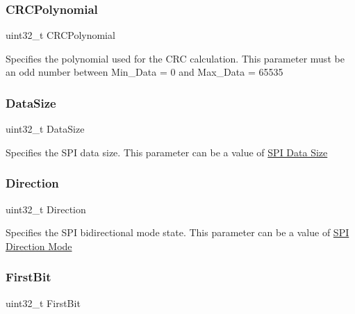 \subsubsection{\texorpdfstring{C\+R\+C\+Polynomial}{CRCPolynomial}}
{\footnotesize\ttfamily uint32\+\_\+t C\+R\+C\+Polynomial}

Specifies the polynomial used for the C\+RC calculation. This parameter must be an odd number between Min\+\_\+\+Data = 0 and Max\+\_\+\+Data = 65535 \mbox{\label{struct_s_p_i___init_type_def_a98999b0cd6e4c94f05b61b2554ee0371}} 
\subsubsection{\texorpdfstring{Data\+Size}{DataSize}}
{\footnotesize\ttfamily uint32\+\_\+t Data\+Size}

Specifies the S\+PI data size. This parameter can be a value of \hyperlink{group___s_p_i___data___size}{S\+PI Data Size} \mbox{\label{struct_s_p_i___init_type_def_ab94410c1333b512e271b1c135fe50916}} 
\subsubsection{\texorpdfstring{Direction}{Direction}}
{\footnotesize\ttfamily uint32\+\_\+t Direction}

Specifies the S\+PI bidirectional mode state. This parameter can be a value of \hyperlink{group___s_p_i___direction}{S\+PI Direction Mode} \mbox{\label{struct_s_p_i___init_type_def_a9740c535f073c87bb06668385ce96002}} 
\subsubsection{\texorpdfstring{First\+Bit}{FirstBit}}
{\footnotesize\ttfamily uint32\+\_\+t First\+Bit}

